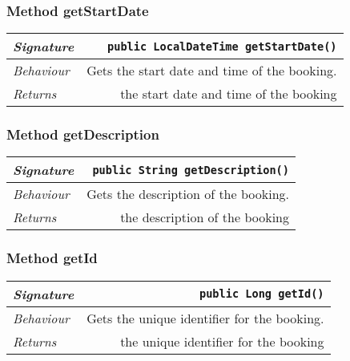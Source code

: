 \begin{adjustwidth}{1.5em}{0pt}
\begin{adjustwidth}{1.5em}{0pt}
\begin{adjustwidth}{1.5em}{0pt}
{\begin{tabularx}{1.0\linewidth}{@{}l R@{}}
      \end{tabularx}}
    \end{adjustwidth}\subsubsection{Method getStartDate\label{edu.kit.hci.soli.domain.Booking@getStartDate()}}
    \begin{adjustwidth}{1.5em}{0pt}
      {\begin{tabularx}{1.0\linewidth}{@{}l R@{}}
        \emph{Signature} & \texttt{public \texttt{LocalDateTime} getStartDate()} \\
        \hline
        \emph{Behaviour} & Gets the start date and time of the booking.    \\
        \hline
        \emph{Returns} & the start date and time of the booking  \\
        \hline
  
      \end{tabularx}}
    \end{adjustwidth}\subsubsection{Method getDescription\label{edu.kit.hci.soli.domain.Booking@getDescription()}}
    \begin{adjustwidth}{1.5em}{0pt}
      {\begin{tabularx}{1.0\linewidth}{@{}l R@{}}
        \emph{Signature} & \texttt{public \texttt{String} getDescription()} \\
        \hline
        \emph{Behaviour} & Gets the description of the booking.    \\
        \hline
        \emph{Returns} & the description of the booking  \\
        \hline
  
      \end{tabularx}}
    \end{adjustwidth}\subsubsection{Method getId\label{edu.kit.hci.soli.domain.Booking@getId()}}
    \begin{adjustwidth}{1.5em}{0pt}
      {\begin{tabularx}{1.0\linewidth}{@{}l R@{}}
        \emph{Signature} & \texttt{public \texttt{Long} getId()} \\
        \hline
        \emph{Behaviour} & Gets the unique identifier for the booking.    \\
        \hline
        \emph{Returns} & the unique identifier for the booking  \\
        \hline
  

\end{tabularx}}
\end{adjustwidth}
\end{adjustwidth}
\end{adjustwidth}
